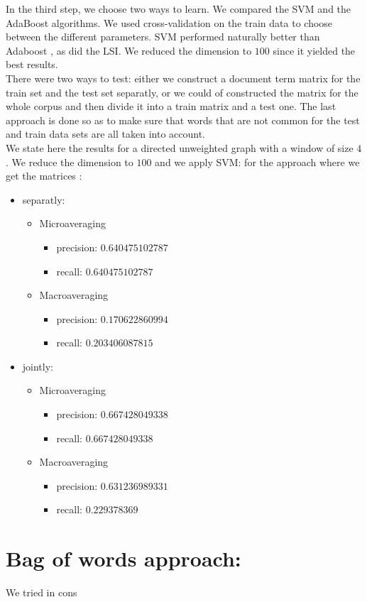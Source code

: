 In the third step, we choose two ways to learn. We compared the SVM and the AdaBoost algorithms. We used cross-validation on the train data to choose between the different parameters. SVM performed naturally better than Adaboost , as did the LSI. We reduced the dimension to $100$ since it yielded the best results.\\

There were two ways to test: either we construct a document term matrix for the train set and the test set separatly, or we could of constructed the matrix for the whole corpus and then divide it into a train matrix and a test one. The last approach is done so as to make sure that words that are not common for the test and train data sets are all taken into account.\\

We state here the results for a directed unweighted graph with a window of size $4$. We reduce the dimension to $100$ and we apply SVM: for the approach where we get the matrices :\\
\begin{itemize}
	 \item separatly: \begin{itemize}
	 	\item Microaveraging \begin{itemize}
	 		\item precision: $0.640475102787$ 
	 		\item recall: $0.640475102787$
	 	\end{itemize}
	 	\item Macroaveraging \begin{itemize}
	 		\item precision: $0.170622860994$
	 		\item recall: $0.203406087815$
	 	\end{itemize}
	 \end{itemize}
	 
	 \item jointly: \begin{itemize}
	 	\item Microaveraging \begin{itemize}
	 		\item precision: $0.667428049338$ 
	 		\item recall: $0.667428049338$
	 	\end{itemize}
	 	\item Macroaveraging \begin{itemize}
	 		\item precision: $0.631236989331$
	 		\item recall: $0.229378369$
	 	\end{itemize}
	 \end{itemize}
\end{itemize}
\section{Bag of words approach:}

We tried in cons




